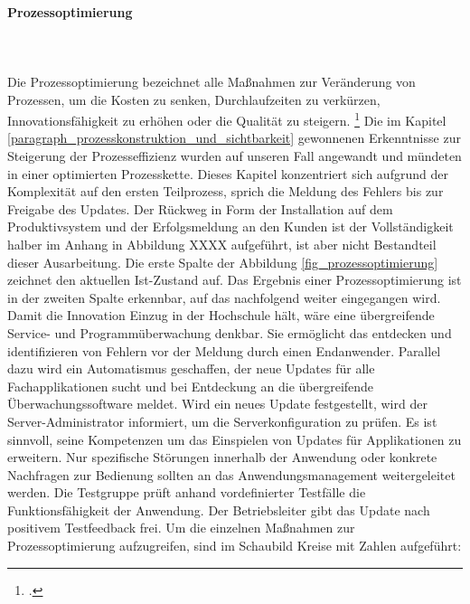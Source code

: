 \paragraph{Prozessoptimierung}\mbox{}\\\\
Die Prozessoptimierung bezeichnet alle Maßnahmen zur Veränderung von Prozessen, um die Kosten zu senken, Durchlaufzeiten zu verkürzen, Innovationsfähigkeit zu erhöhen oder die Qualität zu steigern. \footcite[Vgl.][280]{heinrich_stelzer_2011}
Die im Kapitel \ref{paragraph_prozesskonstruktion_und_sichtbarkeit} gewonnenen Erkenntnisse zur Steigerung der Prozesseffizienz wurden auf unseren Fall angewandt und mündeten in einer optimierten Prozesskette. Dieses Kapitel konzentriert sich aufgrund der Komplexität auf den ersten Teilprozess, sprich die Meldung des Fehlers bis zur Freigabe des Updates. Der Rückweg in Form der Installation auf dem Produktivsystem und der Erfolgsmeldung an den Kunden ist der Vollständigkeit halber im Anhang in Abbildung XXXX aufgeführt, ist aber nicht Bestandteil dieser Ausarbeitung. 
Die erste Spalte der Abbildung \ref{fig_prozessoptimierung} zeichnet den aktuellen Ist-Zustand auf. Das Ergebnis einer Prozessoptimierung ist in der zweiten Spalte erkennbar, auf das nachfolgend weiter eingegangen wird. Damit die Innovation Einzug in der Hochschule hält, wäre eine übergreifende Service- und Programmüberwachung denkbar. Sie ermöglicht das entdecken und identifizieren von Fehlern vor der Meldung durch einen Endanwender. Parallel dazu wird ein Automatismus geschaffen, der neue Updates für alle Fachapplikationen sucht und bei Entdeckung an die übergreifende Überwachungssoftware meldet. Wird ein neues Update festgestellt, wird der Server-Administrator informiert, um die Serverkonfiguration zu prüfen. Es ist sinnvoll, seine Kompetenzen um das Einspielen von Updates für Applikationen zu erweitern. Nur spezifische Störungen innerhalb der Anwendung oder konkrete Nachfragen zur Bedienung sollten an das Anwendungsmanagement weitergeleitet werden.  Die Testgruppe prüft anhand vordefinierter Testfälle die Funktionsfähigkeit der Anwendung. Der Betriebsleiter gibt das Update nach positivem Testfeedback frei.
Um die einzelnen Maßnahmen zur Prozessoptimierung aufzugreifen, sind im Schaubild Kreise mit Zahlen aufgeführt:

